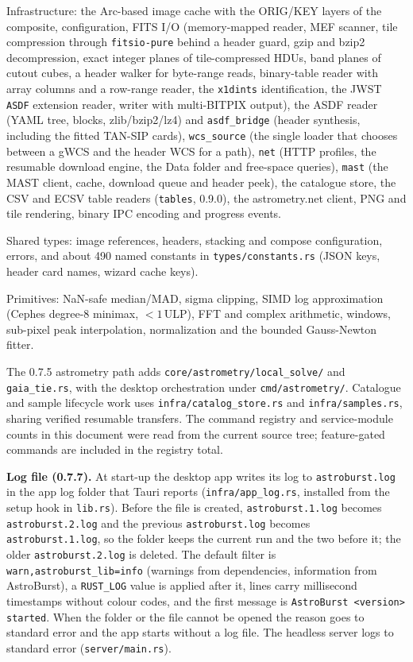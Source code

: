 \documentclass[11pt,a4paper]{article}
\newcommand{\code}[1]{\texttt{\small #1}}
\newcommand{\crate}[1]{\texttt{#1}}
\begin{document}
\begin{description}[style=nextline, leftmargin=2cm]
    \item[\texttt{infra/}] Infrastructure: the Arc-based image cache with the ORIG/KEY layers of the composite, configuration, FITS I/O (memory-mapped reader, MEF scanner, tile compression through \crate{fitsio-pure} behind a header guard, gzip and bzip2 decompression, exact integer planes of tile-compressed HDUs, band planes of cutout cubes, a header walker for byte-range reads, binary-table reader with array columns and a row-range reader, the \code{x1dints} identification, the JWST \code{ASDF} extension reader, writer with multi-BITPIX output), the ASDF reader (YAML tree, blocks, zlib/bzip2/lz4) and \code{asdf\_bridge} (header synthesis, including the fitted TAN-SIP cards), \code{wcs\_source} (the single loader that chooses between a gWCS and the header WCS for a path), \code{net} (HTTP profiles, the resumable download engine, the Data folder and free-space queries), \code{mast} (the MAST client, cache, download queue and header peek), the catalogue store, the CSV and ECSV table readers (\code{tables}, 0.9.0), the astrometry.net client, PNG and tile rendering, binary IPC encoding and progress events.
    \item[\texttt{types/}] Shared types: image references, headers, stacking and compose configuration, errors, and about 490 named constants in \code{types/constants.rs} (JSON keys, header card names, wizard cache keys).
    \item[\texttt{math/}] Primitives: NaN-safe median/MAD, sigma clipping, SIMD log approximation (Cephes degree-8 minimax, $<1$\,ULP), FFT and complex arithmetic, windows, sub-pixel peak interpolation, normalization and the bounded Gauss-Newton fitter.
    \end{description}

    The 0.7.5 astrometry path adds \code{core/astrometry/local\_solve/} and \code{gaia\_tie.rs}, with the desktop orchestration under \code{cmd/astrometry/}. Catalogue and sample lifecycle work uses \code{infra/catalog\_store.rs} and \code{infra/samples.rs}, sharing verified resumable transfers. The command registry and service-module counts in this document were read from the current source tree; feature-gated commands are included in the registry total.

    \textbf{Log file (0.7.7).} At start-up the desktop app writes its log to \code{astroburst.log} in the app log folder that Tauri reports (\code{infra/\allowbreak app\_log.rs}, installed from the setup hook in \code{lib.rs}). Before the file is created, \code{astroburst.1.log} becomes \code{astroburst.2.log} and the previous \code{astroburst.log} becomes \code{astroburst.1.log}, so the folder keeps the current run and the two before it; the older \code{astroburst.2.log} is deleted. The default filter is \code{warn,astroburst\_lib=info} (warnings from dependencies, information from AstroBurst), a \code{RUST\_LOG} value is applied after it, lines carry millisecond timestamps without colour codes, and the first message is \code{AstroBurst <version> started}. When the folder or the file cannot be opened the reason goes to standard error and the app starts without a log file. The headless server logs to standard error (\code{server/main.rs}).
\end{document}
